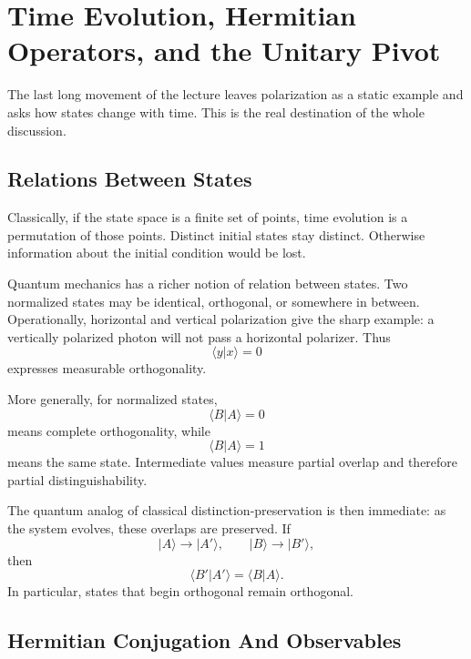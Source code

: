 \section{Time Evolution, Hermitian Operators, and the Unitary Pivot}

The last long movement of the lecture leaves polarization as a static example and asks how states change with time. This is the real destination of the whole discussion.

\subsection{Relations Between States}

Classically, if the state space is a finite set of points, time evolution is a permutation of those points. Distinct initial states stay distinct. Otherwise information about the initial condition would be lost.

Quantum mechanics has a richer notion of relation between states. Two normalized states may be identical, orthogonal, or somewhere in between. Operationally, horizontal and vertical polarization give the sharp example: a vertically polarized photon will not pass a horizontal polarizer. Thus
\begin{equation}
\langle y|x\rangle=0
\end{equation}
expresses measurable orthogonality.

More generally, for normalized states,
\begin{equation}
\langle B|A\rangle=0
\end{equation}
means complete orthogonality, while
\begin{equation}
\langle B|A\rangle=1
\end{equation}
means the same state. Intermediate values measure partial overlap and therefore partial distinguishability.

The quantum analog of classical distinction-preservation is then immediate: as the system evolves, these overlaps are preserved. If
\begin{equation}
|A\rangle\to |A'\rangle,
\qquad
|B\rangle\to |B'\rangle,
\end{equation}
then
\begin{equation}
\langle B'|A'\rangle=\langle B|A\rangle.
\end{equation}
In particular, states that begin orthogonal remain orthogonal.

\subsection{Hermitian Conjugation And Observables}

